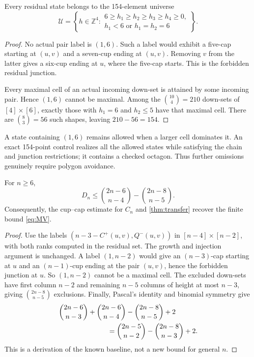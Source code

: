 \begin{proposition}\label{prop:154}
Every residual state belongs to the 154-element universe
\[
 \mathcal U=\left\{h\in\mathbb Z^4:\begin{array}{l}
 6\ge h_1\ge h_2\ge h_3\ge h_4\ge0,\\
 h_1<6\text{ or }h_1=h_2=6
 \end{array}\right\}.
\]
\end{proposition}
\begin{proof}
No actual pair label is $(1,6)$. Such a label would exhibit a five-cap
starting at $(u,v)$ and a seven-cup ending at $(u,v)$. Removing $v$
from the latter gives a six-cup ending at $u$, where the five-cap starts.
This is the forbidden residual junction.

Every maximal cell of an actual incoming down-set is attained by
some incoming pair. Hence $(1,6)$ cannot be maximal. Among the
$\binom{10}{4}=210$ down-sets of $[4]\times[6]$, exactly those with
$h_1=6$ and $h_2\le5$ have that maximal cell. There are
$\binom83=56$ such shapes, leaving $210-56=154$.
\end{proof}

A state containing $(1,6)$ remains allowed when a larger cell
dominates it. An exact
154-point control realizes all the allowed states while satisfying
the chain and junction restrictions; it contains a checked octagon.
Thus further omissions genuinely require polygon avoidance.

\begin{proposition}\label{prop:baseline}
For $n\ge6$,
\[
 D_n\le\binom{2n-6}{n-4}-\binom{2n-8}{n-5}.
\]
Consequently, the cup--cap estimate for $C_n$ and
\cref{thm:transfer} recover the finite bound \eqref{eq:MV}.
\end{proposition}
\begin{proof}
Use the labels $(n-3-C^+(u,v),Q^-(u,v))$ in
$[n-4]\times[n-2]$, with both ranks computed in the residual set.
The growth and injection argument is unchanged. A label $(1,n-2)$
would give an $(n-3)$-cap starting at $u$ and an $(n-1)$-cup ending
at the pair $(u,v)$, hence the forbidden junction at $u$.
So $(1,n-2)$ cannot be a maximal cell. The excluded down-sets have
first column $n-2$ and remaining $n-5$ columns of height at most
$n-3$, giving $\binom{2n-8}{n-5}$ exclusions.
Finally, Pascal's identity and binomial symmetry give
\begin{align*}
 &\binom{2n-6}{n-3}+\binom{2n-6}{n-4}-\binom{2n-8}{n-5}+2\\
 &\hspace{25mm}=\binom{2n-5}{n-2}-\binom{2n-8}{n-3}+2.
\end{align*}
This is a derivation of the known baseline, not a new bound for general $n$.
\end{proof}

